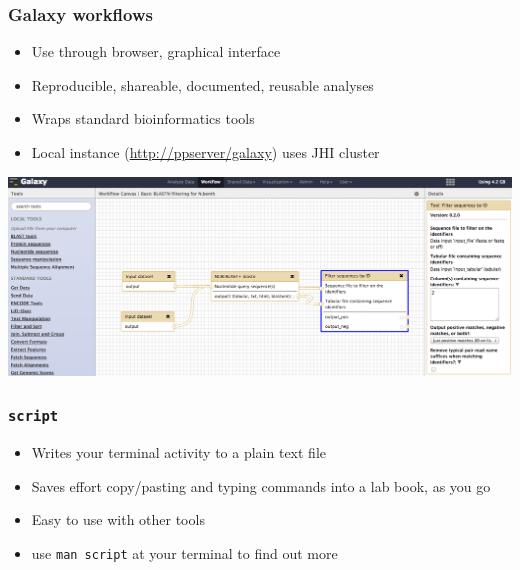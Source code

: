 \documentclass[table]{beamer}
\begin{document}
   \begin{frame}
     \frametitle{Galaxy workflows}
     \begin{itemize}
       \item Use through browser, graphical interface
       \item Reproducible, shareable, documented, reusable analyses
       \item Wraps standard bioinformatics tools
       \item Local instance (\url{http://ppserver/galaxy}) uses JHI cluster       
     \end{itemize}
     \begin{center}
       \includegraphics[width=.75\textwidth]{images/galaxy_screenshot}
     \end{center}
   \end{frame}      
   
   \begin{frame}
     \frametitle{\texttt{script}}
     \begin{itemize}
       \item Writes your terminal activity to a plain text file
       \item Saves effort copy/pasting and typing commands into a lab book, as you go
       \item Easy to use with other tools 
       \item use \texttt{man script} at your terminal to find out more
     \end{itemize}
   \end{frame}   
   
\end{document}
